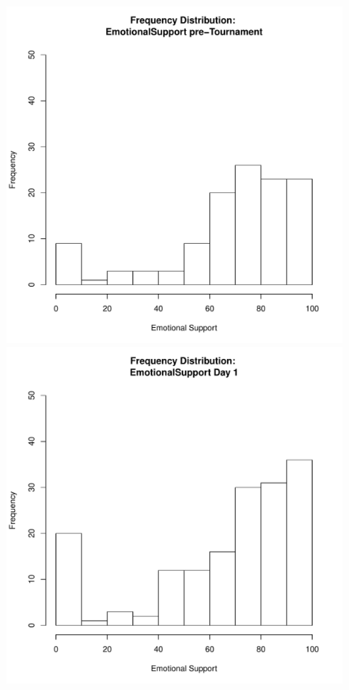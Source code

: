 \documentclass[12pt]{report}
\begin{document}
{%

\begin{figure}[htbp]
  \includegraphics[scale =.4]{../images/distEmotionalSupportPre.pdf}
  \includegraphics[scale =.4]{../images/distEmotionalSupportDay1.pdf}

\end{figure}}
\end{document}
